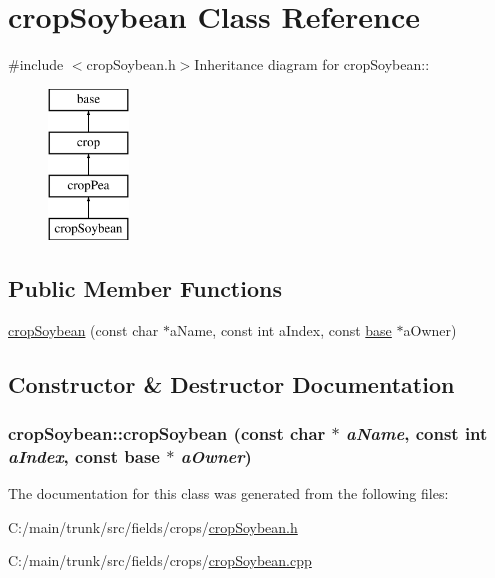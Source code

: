 \hypertarget{classcrop_soybean}{
\section{cropSoybean Class Reference}
\label{classcrop_soybean}
}


{\ttfamily \#include $<$cropSoybean.h$>$}Inheritance diagram for cropSoybean::\begin{figure}[H]
\begin{center}
\leavevmode
\includegraphics[height=4cm]{classcrop_soybean}
\end{center}
\end{figure}
\subsection*{Public Member Functions}
\begin{DoxyCompactItemize}
\item 
\hyperlink{classcrop_soybean_a6d321dda543865c42a56b9099ffb44ea}{cropSoybean} (const char $\ast$aName, const int aIndex, const \hyperlink{classbase}{base} $\ast$aOwner)
\end{DoxyCompactItemize}


\subsection{Constructor \& Destructor Documentation}
\hypertarget{classcrop_soybean_a6d321dda543865c42a56b9099ffb44ea}{
\subsubsection[{cropSoybean}]{\setlength{\rightskip}{0pt plus 5cm}cropSoybean::cropSoybean (const char $\ast$ {\em aName}, \/  const int {\em aIndex}, \/  const {\bf base} $\ast$ {\em aOwner})}}
\label{classcrop_soybean_a6d321dda543865c42a56b9099ffb44ea}


The documentation for this class was generated from the following files:\begin{DoxyCompactItemize}
\item 
C:/main/trunk/src/fields/crops/\hyperlink{crop_soybean_8h}{cropSoybean.h}\item 
C:/main/trunk/src/fields/crops/\hyperlink{crop_soybean_8cpp}{cropSoybean.cpp}\end{DoxyCompactItemize}
